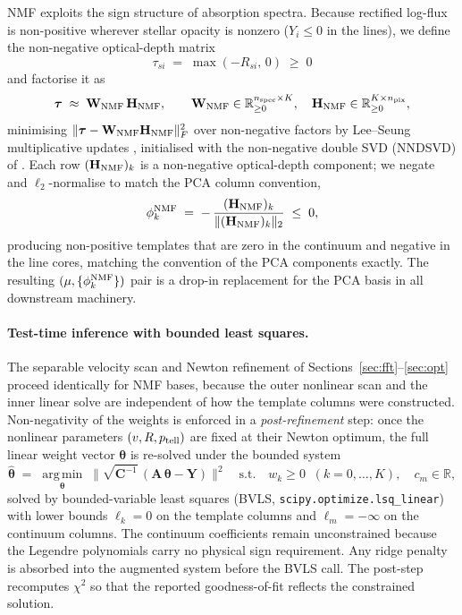 \documentclass[11pt]{article}
\newcommand{\argmin}{\operatorname*{arg\,min}}
\begin{document}
NMF exploits the sign structure of absorption spectra. Because rectified log-flux is
non-positive wherever stellar opacity is nonzero ($Y_i \leq 0$ in the lines), we
define the non-negative optical-depth matrix
\begin{equation}
  \tau_{si} \;=\; \max(-R_{si},\,0) \;\geq\; 0
\end{equation}
and factorise it as
\begin{equation}
  \boldsymbol\tau \;\approx\; \mathbf{W}_{\rm NMF}\,\mathbf{H}_{\rm NMF},
  \qquad
  \mathbf{W}_{\rm NMF} \in \mathbb{R}^{n_{\rm spec}\times K}_{\geq 0},
  \quad
  \mathbf{H}_{\rm NMF} \in \mathbb{R}^{K\times n_{\rm pix}}_{\geq 0},
  \label{eq:nmffac}
\end{equation}
minimising $\|\boldsymbol\tau - \mathbf{W}_{\rm NMF}\mathbf{H}_{\rm NMF}\|_F^2$
over non-negative factors by Lee--Seung multiplicative updates
\citep*{LeeSeung1999}, initialised with the non-negative double SVD (NNDSVD) of
\citet*{BoutsidisGallopoulos2008}. Each row $(\mathbf{H}_{\rm NMF})_k$ is a
non-negative optical-depth component; we negate and $\ell_2$-normalise to match the
PCA column convention,
\begin{equation}
  \phi_k^{\rm NMF} \;=\; -\,\frac{(\mathbf{H}_{\rm NMF})_k}{\|(\mathbf{H}_{\rm NMF})_k\|_2}
  \;\leq\; 0,
  \label{eq:nmfphi}
\end{equation}
producing non-positive templates that are zero in the continuum and negative in
the line cores, matching the convention of the PCA components exactly. The
resulting $(\mu, \{\phi_k^{\rm NMF}\})$ pair is a drop-in replacement for the PCA
basis in all downstream machinery.

\paragraph{Test-time inference with bounded least squares.}
The separable velocity scan and Newton refinement of
Sections~\ref{sec:fft}--\ref{sec:opt} proceed identically for NMF bases, because
the outer nonlinear scan and the inner linear solve are independent of how the
template columns were constructed. Non-negativity of the weights is enforced in a
\emph{post-refinement} step: once the nonlinear parameters $(v, R, p_{\rm tell})$
are fixed at their Newton optimum, the full linear weight vector $\boldsymbol\theta$
is re-solved under the bounded system
\begin{equation}
  \widehat{\boldsymbol\theta} \;=\; \argmin_{\boldsymbol\theta}\;
  \|\sqrt{\mathbf{C}^{-1}}\,(\mathbf{A}\,\boldsymbol\theta - \mathbf{Y})\|^2
  \quad\text{s.t.}\quad
  w_k \geq 0\;\;(k=0,\dots,K),\quad c_m \in \mathbb{R},
  \label{eq:bvls}
\end{equation}
solved by bounded-variable least squares (BVLS, \texttt{scipy.optimize.lsq\_linear})
with lower bounds $\ell_k=0$ on the template columns and $\ell_m=-\infty$ on the
continuum columns. The continuum coefficients remain unconstrained because the
Legendre polynomials carry no physical sign requirement. Any ridge penalty is
absorbed into the augmented system before the BVLS call. The post-step recomputes
$\chi^2$ so that the reported goodness-of-fit reflects the constrained solution.
\end{document}

